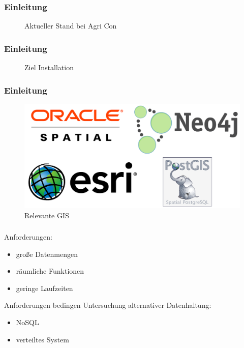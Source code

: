 \documentclass{beamer}
\begin{document}
\begin{frame}\frametitle{Einleitung}
\begin{figure}
\centering

\caption{Aktueller Stand bei Agri Con}
\end{figure}
\end{frame}

\begin{frame}\frametitle{Einleitung}
\begin{figure}[h!]
\centering
\resizebox{.92\linewidth}{!}{}
\caption{Ziel Installation}
\end{figure}
\end{frame}

\begin{frame}\frametitle{Einleitung}
\begin{figure}
\centering
\includegraphics[width=1\hsize]{Logos.png}
\caption{Relevante GIS}
\end{figure}
\end{frame}

\begin{frame}\frametitle{}
\begin{block}{Anforderungen:}
\begin{itemize}
\item große Datenmengen
\item räumliche Funktionen
\item geringe Laufzeiten
\end{itemize}
\end{block}
\vspace{\baselineskip}
\vspace{\baselineskip}
\begin{block}{
Anforderungen bedingen Untersuchung alternativer Datenhaltung:}
\begin{itemize}
\item NoSQL
\item verteiltes System
\end{itemize}
\end{block}
\end{frame}
\end{document}
